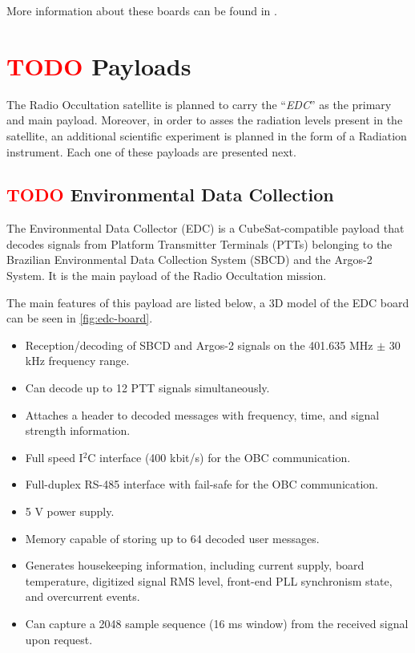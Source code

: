 More information about these boards can be found in \cite{iip}.

\section{ \textcolor{red}{TODO} Payloads}

The Radio Occultation satellite is planned to carry the ``\textit{EDC}'' as the primary and main payload. Moreover, in order to asses the radiation levels present in the satellite, an additional scientific experiment is planned in the form of a Radiation instrument. Each one of these payloads are presented next.

\subsection{ \textcolor{red}{TODO} Environmental Data Collection}

The Environmental Data Collector (EDC) is a CubeSat-compatible payload that decodes signals from Platform Transmitter Terminals (PTTs) belonging to the Brazilian Environmental Data Collection System (SBCD) and the Argos-2 System. It is the main payload of the Radio Occultation mission.

The main features of this payload are listed below, a 3D model of the EDC board can be seen in \autoref{fig:edc-board}.

\begin{itemize}
    \item Reception/decoding of SBCD and Argos-2 signals on the 401.635 MHz $\pm$ 30 kHz frequency range.
    \item Can decode up to 12 PTT signals simultaneously.
    \item Attaches a header to decoded messages with frequency, time, and signal strength information.
    \item Full speed I$^{2}$C interface (400 kbit/s) for the OBC communication.
    \item Full-duplex RS-485 interface with fail-safe for the OBC communication.
    \item 5 V power supply.
    \item Memory capable of storing up to 64 decoded user messages.
    \item Generates housekeeping information, including current supply, board temperature, digitized signal RMS level, front-end PLL synchronism state, and overcurrent events.
    \item Can capture a 2048 sample sequence (16 ms window) from the received signal upon request.
\end{itemize}

